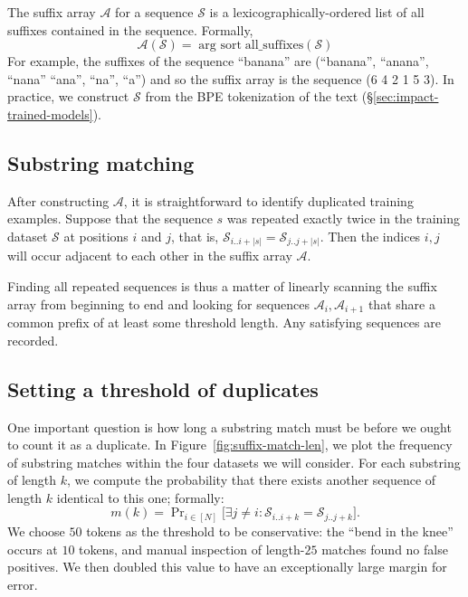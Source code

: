 The suffix array $\mathcal{A}$ for a sequence $\mathcal{S}$ is a lexicographically-ordered list of all suffixes contained in the sequence. 
%
Formally,
\[ \mathcal{A}(\mathcal{S}) = \mathop{\text{arg sort}} \text{all\_suffixes}(\mathcal{S}) \]
%
For example, the suffixes of the sequence ``banana'' are (``banana'',  ``anana'', ``nana'' ``ana'', ``na'', ``a'')
and so the suffix array is the sequence (6 4 2 1 5 3).
In practice, we construct $\mathcal{S}$ from the BPE tokenization of the text (\S\ref{sec:impact-trained-models}).




\subsection{Substring matching}

After constructing $\mathcal{A}$, it is straightforward to identify duplicated training examples.
Suppose that the sequence $s$ was repeated exactly twice in the training dataset $\mathcal{S}$ at positions $i$ and $j$,
that is, $\mathcal{S}_{i..i+|s|} = \mathcal{S}_{j..j+|s|}$.
%
Then the indices $i, j$ will occur adjacent to each other in the suffix array $\mathcal{A}$.

Finding all repeated sequences is thus a matter of linearly scanning the suffix array from
beginning to end and looking for sequences $\mathcal{A}_i, \mathcal{A}_{i+1}$ that share a common prefix of
at least some threshold length.
%
Any satisfying sequences are recorded.
%

\subsection{Setting a threshold of duplicates}
\label{section:exact_thresh}
One important question is how long a substring match must be before we ought to count it as a duplicate.
%
In Figure~\ref{fig:suffix-match-len}, we plot the frequency of substring matches within the four datasets we will
consider.
For each substring of length $k$, we compute the probability that there exists another sequence of length $k$ identical to this one; formally:
\[m(k) = \mathop{\text{Pr}}_{i \in [N]}\big[ \exists j \ne i : \mathcal{S}_{i..i+k} = \mathcal{S}_{j..j+k}\big].\]
We choose $50$ tokens as the threshold to be conservative:
the ``bend in the knee'' occurs at $10$ tokens, and manual inspection of
length-$25$ matches found no false positives.
We then doubled this value to have an exceptionally large margin for error.

